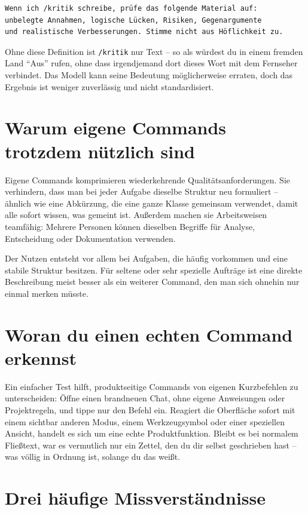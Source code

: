 \begin{lstlisting}
Wenn ich /kritik schreibe, prüfe das folgende Material auf:
unbelegte Annahmen, logische Lücken, Risiken, Gegenargumente
und realistische Verbesserungen. Stimme nicht aus Höflichkeit zu.
\end{lstlisting}

Ohne diese Definition ist \texttt{/kritik} nur Text -- so als würdest du in einem fremden Land ``Aus'' rufen, ohne dass irgendjemand dort dieses Wort mit dem Fernseher verbindet. Das Modell kann seine Bedeutung möglicherweise erraten, doch das Ergebnis ist weniger zuverlässig und nicht standardisiert.

\section{Warum eigene Commands trotzdem nützlich sind}

Eigene Commands komprimieren wiederkehrende Qualitätsanforderungen. Sie verhindern, dass man bei jeder Aufgabe dieselbe Struktur neu formuliert -- ähnlich wie eine Abkürzung, die eine ganze Klasse gemeinsam verwendet, damit alle sofort wissen, was gemeint ist. Außerdem machen sie Arbeitsweisen teamfähig: Mehrere Personen können dieselben Begriffe für Analyse, Entscheidung oder Dokumentation verwenden.

Der Nutzen entsteht vor allem bei Aufgaben, die häufig vorkommen und eine stabile Struktur besitzen. Für seltene oder sehr spezielle Aufträge ist eine direkte Beschreibung meist besser als ein weiterer Command, den man sich ohnehin nur einmal merken müsste.

\section{Woran du einen echten Command erkennst}

Ein einfacher Test hilft, produktseitige Commands von eigenen Kurzbefehlen zu unterscheiden: Öffne einen brandneuen Chat, ohne eigene Anweisungen oder Projektregeln, und tippe nur den Befehl ein. Reagiert die Oberfläche sofort mit einem sichtbar anderen Modus, einem Werkzeugsymbol oder einer speziellen Ansicht, handelt es sich um eine echte Produktfunktion. Bleibt es bei normalem Fließtext, war es vermutlich nur ein Zettel, den du dir selbst geschrieben hast -- was völlig in Ordnung ist, solange du das weißt.

\section{Drei häufige Missverständnisse}

